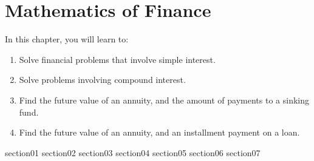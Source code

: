 \chapter{Mathematics of Finance}\label{chapter_mathematics_of_finance}

In this chapter, you will learn to:
\begin{enumerate}
    \item Solve financial problems that involve simple interest.
    \item Solve problems involving compound interest.
    \item Find the future value of an annuity, and the amount of payments to a sinking fund.
    \item Find the future value of an annuity, and an installment payment on a loan.
\end{enumerate}


{section01}
{section02}
{section03}
{section04}
{section05}
{section06}
{section07}